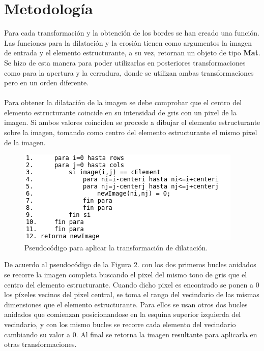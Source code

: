 \documentclass[conference]{IEEEtran}
\begin{document}
 

\section{Metodolog\'ia}
Para cada transformaci\'on y la obtenci\'on de los bordes se han creado una funci\'on. Las funciones para la dilataci\'on y la erosi\'on tienen como argumentos la imagen de entrada y el elemento estructurante, a su vez, retornan un objeto de tipo \textbf{Mat}.\\
Se hizo de esta manera para poder utilizarlas en posteriores transformaciones como para la apertura y la cerradura, donde se utilizan ambas transformaciones pero en un orden diferente.\\\\
Para obtener la dilataci\'on de la imagen se debe comprobar que el centro del elemento estructurante coincide en su intensidad de gris con un pixel de la imagen. Si ambos valores coinciden se procede a dibujar el elemento estructurante sobre la imagen, tomando como centro del elemento estructurante el mismo pixel de la imagen.

\begin{figure}[h]
	\begin{center}
		\setlength{\unitlength}{0.00105in}
		\includegraphics[scale=0.45]{./images/algoritmo1.png}
	\end{center}
	\caption{Pseudoc\'odigo para aplicar la transformaci\'on de dilataci\'on.}
\end{figure}

De acuerdo al pseudoc\'odigo de la Figura 2. con los dos primeros bucles anidados se recorre la imagen completa buscando el pixel del mismo tono de gris que el centro del elemento estructurante. Cuando dicho pixel es encontrado se ponen a 0 los p\'ixeles vecinos del pixel central, se toma el rango del vecindario de las mismas dimensiones que el elemento estructurante. Para ellos se usan otros dos bucles anidados que comienzan posicionandose en la esquina superior izquierda del vecindario, y con los mismo bucles se recorre cada elemento del vecindario cambiando su valor a 0. Al final se retorna la imagen resultante para aplicarla en otras transformaciones.\\
\end{document}
